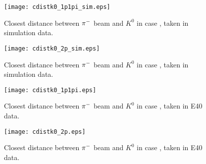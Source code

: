 

\begin{figure}[!h]
  \begin{center}
    \texttt{[image: cdistk0\_1p1pi\_sim.eps]}
    \caption{Closest distance between $\pi^{-}$ beam and $K^{0}$ in case , taken in simulation data.}
    \label{fig-cdistk0_1p1pi_sim}
  \end{center}
\end{figure}

\begin{figure}[!h]
  \begin{center}
    \texttt{[image: cdistk0\_2p\_sim.eps]}
    \caption{Closest distance between $\pi^{-}$ beam and $K^{0}$ in case , taken in simulation data.}
    \label{fig-cdistk0_2p_sim}
  \end{center}
\end{figure}

\begin{figure}[!h]
  \begin{center}
    \texttt{[image: cdistk0\_1p1pi.eps]}
    \caption{Closest distance between $\pi^{-}$ beam and $K^{0}$ in case , taken in E40 data.}
    \label{fig-cdistk0_1p1pi}
  \end{center}
\end{figure}

\begin{figure}[!h]
  \begin{center}
    \texttt{[image: cdistk0\_2p.eps]}
    \caption{Closest distance between $\pi^{-}$ beam and $K^{0}$ in case , taken in E40 data.}
    \label{fig-cdistk0_2p}
  \end{center}
\end{figure}

